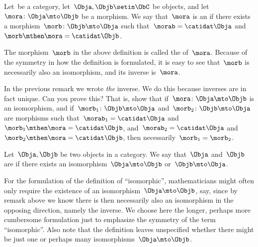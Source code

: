 \begin{ctdefinition}[Isomorphism]
    \label{def:isomorphism}
    Let~\CatC be a category, let~$\Obja,\Objb \setin \ObC$ be objects, and let~$\mora \colon \Obja \mto \Objb$ be a morphism.
    We say that~$\mora$ is an  if there exists a morphism~$\morb\colon \Objb \mto \Obja$ such that~$\morab = \catidat\Obja$ and~$\morb \mthen \mora = \catidat\Objb$.
\end{ctdefinition}

\begin{remark}
    \label{rem:inverse}
    The morphism~$\morb$ in the above definition is called the \textbf{} of~$\mora$.
    Because of the symmetry in how the definition is formulated, it is easy to see that~$\morb$ is necessarily also an isomorphism, and its inverse is~$\mora$.
\end{remark}

\begin{exercise}
    \label{ex:isoinverse}
    In the previous remark we wrote \emph{the} inverse.
    We do this because inverses are in fact unique.
    Can you prove this?
    That is, show that if~$\mora \colon \Obja \mto \Objb$ is an isomorphism, and if~$\morb_1\colon \Objb \mto \Obja$ and~$\morb_2\colon \Objb \mto \Obja$ are morphisms such that~$\morab_1 = \catidat\Obja$ and~$\morb_1 \mthen \mora = \catidat\Objb$, and~$\morab_2 = \catidat\Obja$ and~$\morb_2 \mthen \mora = \catidat\Objb$, then necessarily~$\morb_1 = \morb_2$.
\end{exercise}
\begin{solution}
    \missingsolution

\end{solution}

\begin{ctdefinition}\label{def:isomorphic-objects}
    Let~$\Obja,\Objb$ be two objects in a category.
    We say that~$\Obja$ and~$\Objb$ are  if there exists an isomorphism~$\Obja \mto \Objb$ or~$\Objb \mto \Obja$.
\end{ctdefinition}

For the formulation of the definition of ``isomorphic'', mathematicians might often only require the existence of an isomorphism~$\Obja \mto \Objb$, say, since by remark above we know there is then necessarily also an isomorphism in the opposing direction, namely the inverse.
We choose here the longer, perhaps more cumbersome formulation just to emphasize the symmetry of the term ``isomorphic''.
Also note that the definition leaves unspecified whether there might be just one or perhaps many isomorphisms~$\Obja \mto \Objb$.

